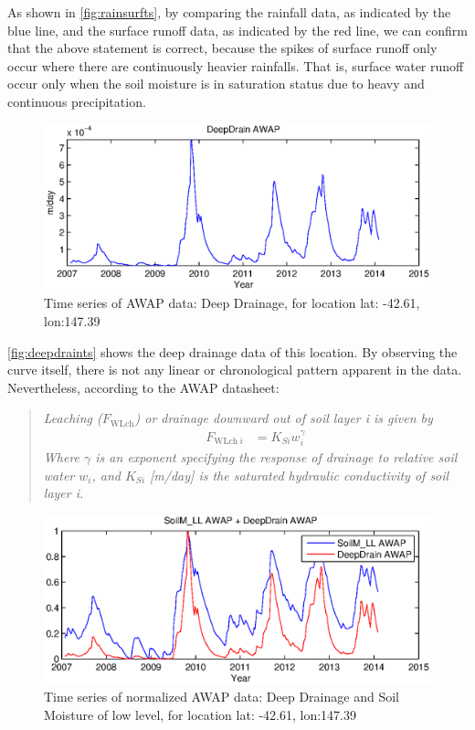 As shown in \autoref{fig:rainsurfts}, by comparing the rainfall data, as indicated by the blue line, and the surface runoff data, as indicated by the red line, we can confirm that the above statement is correct, because the spikes of surface runoff only occur where there are continuously heavier rainfalls. That is, surface water runoff occur only when the soil moisture is in saturation status due to heavy and continuous precipitation.\\
\begin{figure}[hbt]
\begin{center}
\includegraphics[width=\linewidth]{gfx/deepdraints.eps}
\end{center}
\caption{Time series of AWAP data: Deep Drainage, for location lat: -42.61, lon:147.39}
\label{fig:deepdraints}
\end{figure}
\newline
\autoref{fig:deepdraints} shows the deep drainage data of this location. By observing the curve itself, there is not any linear or chronological pattern apparent in the data. Nevertheless, according to the AWAP datasheet:
\begin{quote}
\emph{Leaching ($F_{\text{WLch}}$) or drainage downward out of soil layer i is given by}
\begin{align}
F_{\text{WLch}~i} &= K_{Si}w_i^\gamma
\label{eq:awapleaching}
\end{align}
\emph{Where $\gamma$ is an exponent specifying the response of drainage to relative soil water $w_i$, and $K_{Si}$ [m/day] is the saturated hydraulic conductivity of soil layer i.}
\end{quote}
\begin{figure}[hbt]
\begin{center}
\includegraphics[width=\linewidth]{gfx/soilmdeepts.eps}
\end{center}
\caption{Time series of normalized AWAP data: Deep Drainage and Soil Moisture of low level, for location lat: -42.61, lon:147.39}
\label{fig:soilmdeepts}
\end{figure}
